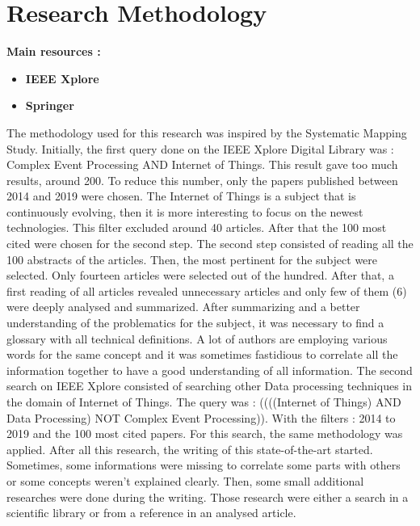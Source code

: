 \documentclass[11pt]{article}
\begin{document}
\newpage


\section{Research Methodology} \label{research-methodology}

\textbf{Main resources :}
\begin{itemize}
	\item \textbf{IEEE Xplore} 
	\item \textbf{Springer} 
\end{itemize}

The methodology used for this research was inspired by the Systematic Mapping Study. \cite{sms} Initially, the first query done on the IEEE Xplore Digital Library was : Complex Event Processing AND Internet of Things. This result gave too much results, around 200. To reduce this number, only the papers published between 2014 and 2019 were chosen. The Internet of Things is a subject that is continuously evolving, then it is more interesting to focus on the newest technologies. This filter excluded around 40 articles. After that the 100 most cited were chosen for the second step.
\newline
\newline
The second step consisted of reading all the 100 abstracts of the articles. Then, the most pertinent for the subject were selected. Only fourteen articles were selected out of the hundred. After that, a first reading of all articles revealed unnecessary articles and only few of them (6) were deeply analysed and summarized. After summarizing and a better understanding of the problematics for the subject, it was necessary to find a glossary \cite{glossary} with all technical definitions. A lot of authors are employing various words for the same concept and it was sometimes fastidious to correlate all the information together to have a good understanding of all information.  
\newline
\newline
The second search on IEEE Xplore consisted of searching other Data processing techniques in the domain of Internet of Things. The query was : ((((Internet of Things) AND Data Processing) NOT Complex Event Processing)). With the filters :  2014 to 2019 and the 100 most cited papers. For this search, the same methodology was applied.
\newline
\newline
After all this research, the writing of this state-of-the-art started. Sometimes, some informations were missing to correlate some parts with others or some concepts weren't explained clearly. Then, some small additional researches were done during the writing. Those research were either a search in a scientific library or from a reference in an analysed article.
\end{document}
